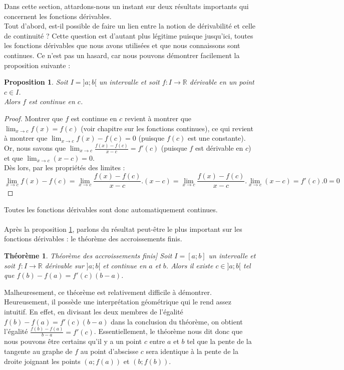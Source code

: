 \documentclass[a4paper,fontsize=13pt]{scrreprt}
\theoremstyle{plain}
\newtheorem{thé}[subsection]{Théorème}
\newtheorem{pro}[subsection]{Proposition}
\theoremstyle{definition}
\newcommand{\rr}{\mathbb{R}}
\begin{document}
Dans cette section, attardons-nous un instant sur deux résultats importants qui concernent les fonctions dérivables. \\
Tout d'abord, est-il possible de faire un lien entre la notion de dérivabilité et celle de continuité ? Cette question est d'autant plus légitime puisque jusqu'ici, toutes les fonctions dérivables que nous avons utilisées et que nous connaissons sont continues. Ce n'est pas un hasard, car nous pouvons démontrer facilement la proposition suivante :
\begin{pro} \label{dercont}
Soit $I=]a;b[$ un intervalle et soit $f:I\to \rr$ dérivable en un point $c \in I$.\\
Alors $f$ est continue en $c$.
\end{pro}
\begin{proof}
Montrer que $f$ est continue en $c$ revient à montrer que $\lim_{x \to c} f(x)=f(c)$ (voir chapitre sur les fonctions continues), ce qui revient à montrer que $\lim_{x \to c} f(x)-f(c)=0$ (puisque $f(c)$ est une constante).\\
Or, nous savons que $\lim_{x \to c} \frac{f(x)-f(c)}{x-c} = f'(c)$ (puisque $f$ est dérivable en $c$) et que $\lim_{x \to c} (x-c)=0$.\\ Dès lors, par les propriétés des limites :
$$\lim_{x \to c} f(x)-f(c) = \lim_{x \to c} \frac{f(x)-f(c)}{x-c} . (x-c)=\lim_{x \to c} \frac{f(x)-f(c)}{x-c} . \lim_{x \to c} (x-c)= f'(c).0=0$$
\end{proof}
Toutes les fonctions dérivables sont donc automatiquement continues.\\
~~\\
Après la proposition \ref{dercont}, parlons du résultat peut-être le plus important sur les fonctions dérivables : le théorème des accroissements finis.
\begin{thé} Théorème des accroissements finis]
Soit $I=[a;b]$ un intervalle et soit $f:I\to \rr$ dérivable sur $]a;b[$ et continue en $a$ et $b$.
Alors il existe $c \in ]a;b[$ tel que $f(b)-f(a)=f'(c)(b-a)$.
\end{thé}
Malheuresement, ce théorème est relativement difficile à démontrer. Heureusement, il possède une interprétation géométrique qui le rend assez intuitif. En effet, en divisant les deux membres de l'égalité $f(b)-f(a)=f'(c)(b-a)$ dans la conclusion du théorème, on obtient l'égalité $\frac{f(b)-f(a)}{b-a}=f'(c)$. Essentiellement, le théorème nous dit donc que nous pouvons être certains qu'il y a un point $c$ entre $a$ et $b$ tel que la pente de la tangente au graphe de $f$ au point d'abscisse $c$ sera identique à la pente de la droite joignant les points $(a;f(a))$ et $(b;f(b))$. \\
\end{document}
